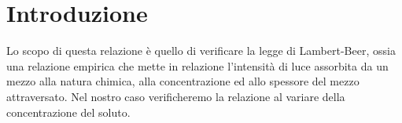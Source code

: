 \section{Introduzione}

Lo scopo di questa relazione è quello di verificare la legge di Lambert-Beer, ossia una relazione empirica che mette in relazione l'intensità di luce assorbita da un mezzo alla natura chimica, alla concentrazione ed allo spessore del mezzo attraversato.
Nel nostro caso verificheremo la relazione al variare della concentrazione del soluto.

